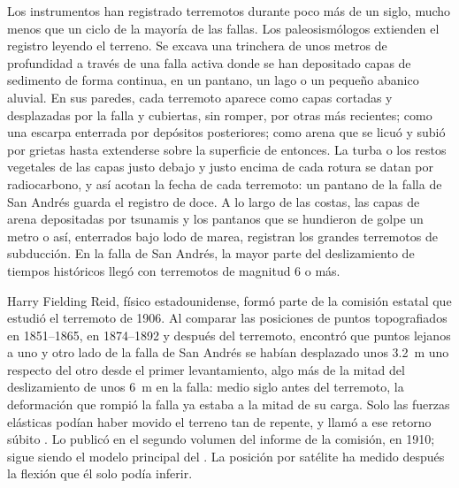 \begin{inthefield}
Los instrumentos han registrado terremotos durante poco más de un siglo, mucho menos que un ciclo de la mayoría de las fallas. Los
paleosismólogos extienden el registro leyendo el terreno. Se excava una trinchera de unos metros de profundidad a través de una falla
activa donde se han depositado capas de sedimento de forma continua, en un pantano, un lago o un pequeño abanico aluvial. En sus
paredes, cada terremoto aparece como capas cortadas y desplazadas por la falla y cubiertas, sin romper, por otras más recientes; como
una escarpa enterrada por depósitos posteriores; como arena que se licuó y subió por grietas hasta extenderse sobre la superficie de
entonces. La turba o los restos vegetales de las capas justo debajo y justo encima de cada rotura se datan por radiocarbono, y así
acotan la fecha de cada terremoto: un pantano de la falla de San Andrés guarda el registro de doce. A lo largo de las costas, las
capas de arena depositadas por tsunamis y los pantanos que se hundieron de golpe un metro o así, enterrados bajo lodo de marea,
registran los grandes terremotos de subducción. En la falla de San Andrés, la mayor parte del deslizamiento de tiempos históricos llegó
con terremotos de magnitud 6 o más.
\end{inthefield}

\begin{history}
Harry Fielding Reid, físico estadounidense, formó parte de la comisión estatal que estudió el terremoto de 1906. Al comparar las
posiciones de puntos topografiados en 1851--1865, en 1874--1892 y después del terremoto, encontró que puntos lejanos a uno y otro lado
de la falla de San Andrés se habían desplazado unos \qty{3.2}{m} uno respecto del otro desde el primer levantamiento, algo más de la
mitad del deslizamiento de unos \qty{6}{m} en la falla: medio siglo antes del terremoto, la deformación que rompió la falla ya estaba
a la mitad de su carga. Solo las fuerzas elásticas podían haber movido el terreno tan de repente, y llamó a ese retorno súbito . Lo publicó en el segundo volumen del informe de la comisión, en 1910; sigue siendo el modelo principal del .
La posición por satélite ha medido después la flexión que él solo podía inferir.
\end{history}

